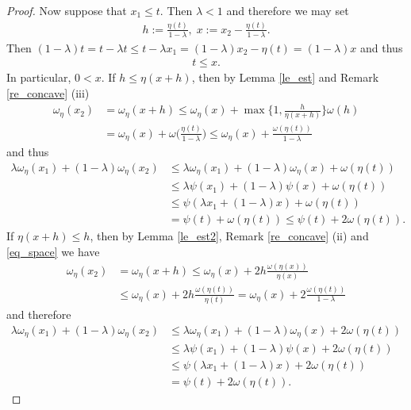 \documentclass[10pt,a4paper]{amsart}
\theoremstyle{definition}
\begin{document}
\begin{proof}
Now suppose that $ x_1\leq t $. Then $ \lambda<1 $ and therefore we may set
\begin{align*}
h:=\frac{\eta(t)}{1-\lambda},\;x:=x_2-\frac{\eta(t)}{1-\lambda}.
\end{align*}
Then $ (1-\lambda)t=t-\lambda t\leq t-\lambda x_1=(1-\lambda)x_2-\eta(t)=(1-\lambda)x $ and thus
\begin{align}\label{eq_space}
t\leq x.
\end{align}
In particular, $ 0<x $. If $ h\leq\eta(x+h) $, then by Lemma \ref{le_est} and Remark \ref{re_concave} (iii)
\begin{align*}
\omega_{\eta}(x_2)&=\omega_{\eta}(x+h)\leq\omega_{\eta}(x)+\max\bigg\lbrace 1,\frac{h}{\eta(x+h)}\bigg\rbrace\omega(h)\\
&=\omega_{\eta}(x)+\omega\bigg(\frac{\eta(t)}{1-\lambda}\bigg)\leq\omega_{\eta}(x)+\frac{\omega(\eta(t))}{1-\lambda}
\end{align*}
and thus
\begin{align*}
\lambda\omega_{\eta}(x_1)+(1-\lambda)\omega_{\eta}(x_2)&\leq\lambda\omega_{\eta}(x_1)+(1-\lambda)\omega_{\eta}(x)+\omega(\eta(t))\\
&\leq\lambda\psi(x_1)+(1-\lambda)\psi(x)+\omega(\eta(t))\\
&\leq\psi(\lambda x_1+(1-\lambda)x)+\omega(\eta(t))\\
&=\psi(t)+\omega(\eta(t))\leq\psi(t)+2\omega(\eta(t)).
\end{align*}
If $ \eta(x+h)\leq h $, then by Lemma \ref{le_est2}, Remark \ref{re_concave} (ii) and \eqref{eq_space} we have
\begin{align*}
\omega_{\eta}(x_2)&=\omega_{\eta}(x+h)\leq\omega_{\eta}(x)+2h\frac{\omega(\eta(x))}{\eta(x)}\\
&\leq\omega_{\eta}(x)+2h\frac{\omega(\eta(t))}{\eta(t)}=\omega_{\eta}(x)+2\frac{\omega(\eta(t))}{1-\lambda}
\end{align*}
and therefore
\begin{align*}
\lambda\omega_{\eta}(x_1)+(1-\lambda)\omega_{\eta}(x_2)&\leq\lambda\omega_{\eta}(x_1)+(1-\lambda)\omega_{\eta}(x)+2\omega(\eta(t))\\
&\leq\lambda\psi(x_1)+(1-\lambda)\psi(x)+2\omega(\eta(t))\\
&\leq\psi(\lambda x_1+(1-\lambda)x)+2\omega(\eta(t))\\
&=\psi(t)+2\omega(\eta(t)).
\end{align*}
\end{proof}
\end{document}
